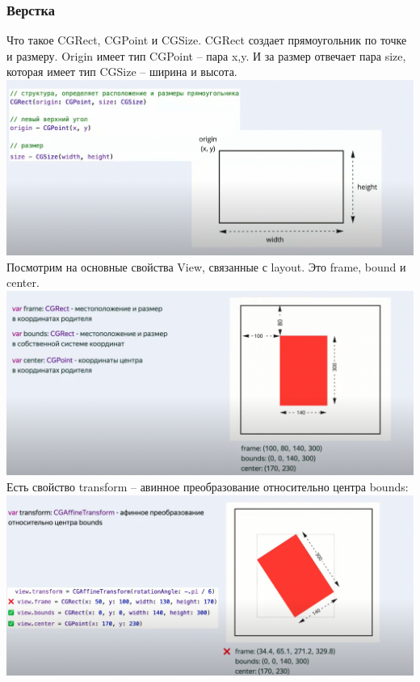 \documentclass{article}
\begin{document}
    \subsubsection{Верстка}
    Что такое CGRect, CGPoint и CGSize. CGRect создает прямоугольник по точке и размеру. Origin имеет тип CGPoint -- пара x,y. И за размер отвечает пара size, которая имеет тип  CGSize -- ширина и высота. 
    \newline
    \includegraphics[scale = 0.3]{pic/Снимок экрана 2023-07-31 в 20.37.47.png}
    \newline
    Посмотрим на основные свойства View, связанные с layout. Это frame, bound и center. 
    \newline
    \includegraphics[scale = 0.3]{pic/Снимок экрана 2023-07-31 в 20.38.45.png}
    \newline
    Есть свойство transform -- авинное преобразование относительно центра bounds: 
    \newline
    \includegraphics[scale = 0.3]{pic/Снимок экрана 2023-07-31 в 20.43.34.png}
\end{document}
